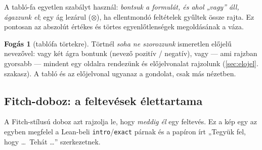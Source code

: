\documentclass[11pt,a4paper]{article}
\newcommand{\lean}[1]{\texttt{\small #1}}
\theoremstyle{definition}
\newtheorem{fogas}{Fogás}[section]
\begin{document}
A tabló-fa egyetlen szabályt használ: \emph{bontsuk a formulát, és ahol „vagy” áll,
ágazzunk el}; egy ág lezárul ($\otimes$), ha ellentmondó feltételek gyűltek össze rajta.
Ez pontosan az abszolút értékes és törtes egyenlőtlenségek megoldásának a váza.

\begin{center}
\end{center}

\begin{fogas}[tablófa törtekre]
Törtnél \emph{soha ne szorozzunk} ismeretlen előjelű nevezővel: vagy két ágra bontunk
(nevező pozitív / negatív), vagy — ami rajzban gyorsabb — mindent egy oldalra rendezünk
és előjelvonalat rajzolunk (\ref{sec:elojel}. szakasz). A tabló és az előjelvonal ugyanaz
a gondolat, csak más nézetben.
\end{fogas}

\subsection{Fitch-doboz: a feltevések élettartama}

A Fitch-stílusú doboz azt rajzolja le, hogy \emph{meddig él} egy feltevés. Ez a
kép egy az egyben megfelel a Lean-beli \lean{intro}/\lean{exact} párnak és a papíron
írt „Tegyük fel, hogy \dots\ Tehát \dots” szerkezetnek.
\end{document}

